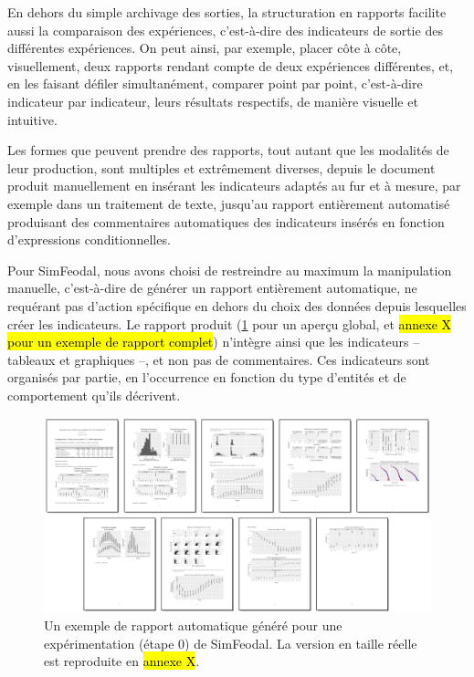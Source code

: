 	En dehors du simple archivage des sorties, la structuration en rapports facilite aussi la comparaison des expériences, c'est-à-dire des indicateurs de sortie des différentes expériences.
	On peut ainsi, par exemple, placer côte à côte, visuellement, deux rapports rendant compte de deux expériences différentes, et, en les faisant défiler simultanément, comparer point par point, c'est-à-dire indicateur par indicateur, leurs résultats respectifs, de manière visuelle et intuitive.

	Les formes que peuvent prendre des rapports, tout autant que les modalités de leur production, sont multiples et extrêmement diverses, depuis le document produit manuellement en insérant les indicateurs adaptés au fur et à mesure, par exemple dans un traitement de texte, jusqu'au rapport entièrement automatisé produisant des commentaires automatiques des indicateurs insérés en fonction d'expressions conditionnelles.

	Pour SimFeodal, nous avons choisi de restreindre au maximum la manipulation manuelle, c'est-à-dire de générer un rapport entièrement automatique, ne requérant pas d'action spécifique en dehors du choix des données depuis lesquelles créer les indicateurs.
	Le rapport produit (\cref{fig:simfeodal_rapport_mini} pour un aperçu global, et \hl{annexe X pour un exemple de rapport complet}) n'intègre ainsi que les indicateurs -- tableaux et graphiques --, et non pas de commentaires.
	Ces indicateurs sont organisés par partie, en l'occurrence en fonction du type d'entités et de comportement qu'ils décrivent.

	\begin{figure}[H]
		\captionsetup{width=\linewidth}
		\includegraphics[width=\linewidth]{img/SimFeodal_Rapport_exemple.png}
		\caption{Un exemple de rapport automatique généré pour une expérimentation (étape 0) de SimFeodal. La version en taille réelle est reproduite en \hl{annexe X}.}
		\label{fig:simfeodal_rapport_mini}
	\end{figure}

